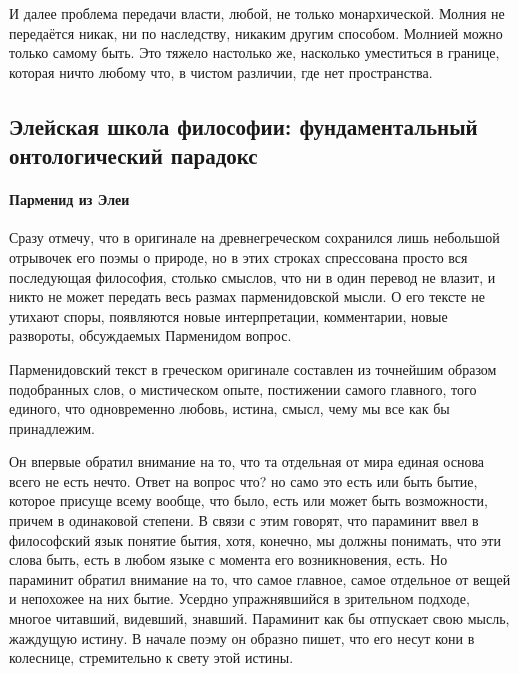 И далее проблема передачи власти, любой, не только монархической. Молния не передаётся никак, ни по наследству, никаким другим способом. Молнией можно только самому быть. Это тяжело настолько же, насколько уместиться в границе, которая ничто любому что, в чистом различии, где нет пространства. 

\subsection{Элейская школа философии: фундаментальный онтологический парадокс}

\paragraph{Парменид из Элеи}

Сразу отмечу, что в оригинале на древнегреческом сохранился лишь небольшой отрывочек его поэмы о природе, но в этих строках спрессована просто вся последующая философия, столько смыслов, что ни в один перевод не влазит, и никто не может передать весь размах парменидовской мысли. О его тексте не утихают споры, появляются новые интерпретации, комментарии, новые развороты, обсуждаемых Парменидом вопрос. 

Парменидовский текст в греческом оригинале составлен из точнейшим образом подобранных слов, о мистическом опыте, постижении самого главного, того единого, что одновременно
любовь, истина, смысл, чему мы все как бы принадлежим. 

Он впервые обратил внимание на то, что
та отдельная от мира единая основа всего не есть нечто. Ответ на вопрос что? но
само это есть или быть бытие, которое присуще всему вообще, что было, есть или
может быть возможности, причем в одинаковой степени. В связи с этим говорят, что
параминит ввел в философский язык понятие бытия, хотя, конечно, мы должны
понимать, что эти слова быть, есть в любом языке с момента его возникновения,
есть. Но параминит обратил внимание на то, что самое главное, самое отдельное от
вещей и непохожее на них бытие. Усердно упражнявшийся в зрительном подходе,
многое читавший, видевший, знавший. Параминит как бы отпускает свою мысль,
жаждущую истину. В начале поэму он образно пишет, что его несут кони в
колеснице, стремительно к свету этой истины. 

